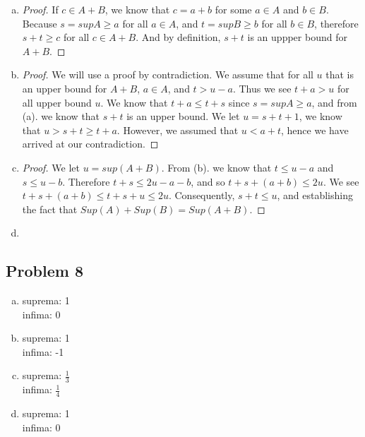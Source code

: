 \documentclass[12pt]{article}
\begin{document}
\begin{enumerate}[a).]
    \item {
        \begin{proof}
            If $c \in A + B$, we know that $c = a + b$ for some $a \in A$ and $b \in B$. 
            Because $s = supA \ge a$ for all $a \in A$, and $t = supB \ge b$ for all $b \in B$, therefore $s+t \ge c$ for all $c \in A + B$. 
            And by definition, $s+t$ is an uppper bound for $A + B$. 
        \end{proof}
    }
    \item {
        \begin{proof}
            We will use a proof by contradiction. 
            We assume that for all $u$ that is an upper bound for $A + B$, $a \in A$, and $t > u - a$. 
            Thus we see $t+a > u$ for all upper bound $u$.
            We know that $t + a \le t + s$ since $s = supA \ge a$, and from (a). we know that $s+t$ is an upper bound. 
            We let $u = s + t + 1$, we know that $u > s+t \ge t + a$. 
            However, we assumed that $u < a+t$, hence we have arrived at our contradiction.
        \end{proof}

    }
    \item {
        \begin{proof}
            We let $u = sup(A+B)$.
            From (b). we know that $t \le u -a$ and $s \le u -b$. 
            Therefore $t+s \le 2u - a - b$, and so $t+s + (a+b) \le 2u$.
            We see $t + s + (a + b) \le t + s + u \le 2u$.
            Consequently, $s + t \le u$, and establishing the fact that $Sup(A) + Sup(B) = Sup(A+B)$. 
            
        \end{proof}
    }
    \item{

    }
\end{enumerate}

\subsection*{Problem 8}
\begin{enumerate}[a).]
    \item {
        suprema: 1\\
        infima: 0
    }
    \item {
        suprema: 1\\
        infima: -1 
    }
    \item {
        suprema: $\frac{1}{3}$\\
        infima: $\frac{1}{4}$
    }
    \item {
        suprema: 1\\
        infima: 0
    }
\end{enumerate}
\end{document}
